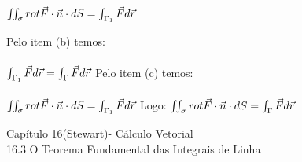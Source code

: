 \documentclass[11pt,a4paper]{article}
\begin{document}
\begin{enumerate}
{                            $\iint_\sigma rot\vec{F}\cdot\vec{n}\cdot dS = \int_{\Gamma_1} \vec{F}d\vec{r}\\\\$
                            \item Pelo item (b) temos:\\\\
                            $\int_{\Gamma_1} \vec{F}d\vec{r} = \int_{\Gamma} \vec{F}d\vec{r}\\\\$
                            Pelo item (c) temos:\\\\
                            $\iint_\sigma rot\vec{F}\cdot\vec{n}\cdot dS = \int_{\Gamma_1} \vec{F}d\vec{r}\\\\$
                            Logo:
                            $\iint_\sigma rot\vec{F}\cdot\vec{n}\cdot dS = \int_{\Gamma} \vec{F}d\vec{r}\\\\$

			
    \begin{center}
        \begin{large}
	        Capítulo 16(Stewart)- Cálculo Vetorial\\16.3 O Teorema Fundamental das Integrais de Linha
	   \end{large}
	\end{center}
	

}
\end{enumerate}
\end{document}
